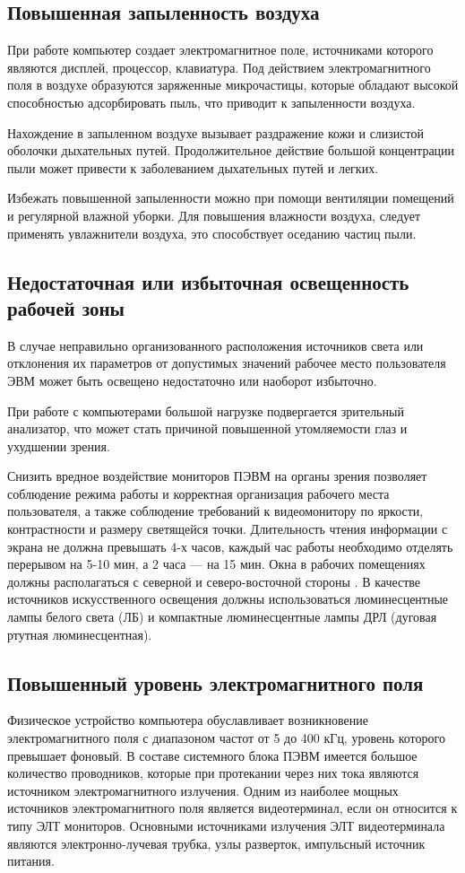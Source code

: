 \documentclass[14pt,oneside,final]{extreport}
\begin{document}
	\subsection{Повышенная запыленность воздуха}
	При работе компьютер создает электромагнитное поле, источниками которого являются дисплей, процессор, клавиатура. Под действием электромагнитного поля в воздухе образуются заряженные микрочастицы, которые обладают высокой способностью адсорбировать пыль, что приводит к запыленности воздуха. 
	
	Нахождение в запыленном воздухе вызывает раздражение кожи и слизистой оболочки дыхательных путей. Продолжительное действие большой концентрации пыли может привести к заболеванием дыхательных путей и легких. 
	
	Избежать повышенной запыленности можно при помощи вентиляции помещений и регулярной влажной уборки. Для повышения влажности воздуха, следует применять увлажнители воздуха, это способствует оседанию частиц пыли. 
	\subsection{Недостаточная или избыточная освещенность рабочей зоны}
	В случае неправильно организованного расположения источников света или отклонения их параметров от допустимых значений рабочее место пользователя ЭВМ может быть освещено недостаточно или наоборот избыточно.
	
	При работе с компьютерами большой нагрузке подвергается зрительный анализатор, что может стать причиной повышенной утомляемости глаз и ухудшении зрения.
	
	Снизить вредное воздействие мониторов ПЭВМ на органы зрения позволяет соблюдение режима работы и корректная организация рабочего места пользователя, а также соблюдение требований к видеомонитору по яркости, контрастности и размеру светящейся точки. Длительность чтения информации с экрана не должна превышать 4-х часов, каждый час работы необходимо отделять перерывом на 5-10 мин, а 2 часа --- на 15 мин. Окна в рабочих помещениях должны располагаться с северной и северо-восточной стороны \cite{book:BZD}. В качестве источников искусственного освещения должны использоваться люминесцентные лампы белого света (ЛБ) и компактные люминесцентные лампы ДРЛ (дуговая ртутная люминесцентная). 
	\subsection{Повышенный уровень электромагнитного поля}
	Физическое устройство компьютера обуславливает возникновение электромагнитного поля с диапазоном частот от 5 до 400 кГц, уровень которого превышает фоновый. В составе системного блока ПЭВМ имеется большое количество проводников, которые при протекании через них тока являются источником электромагнитного излучения. Одним из наиболее мощных источников электромагнитного поля является видеотерминал, если он относится к типу ЭЛТ мониторов. Основными источниками излучения ЭЛТ видеотерминала являются электронно-лучевая трубка, узлы разверток, импульсный источник питания. 
	
\end{document}
